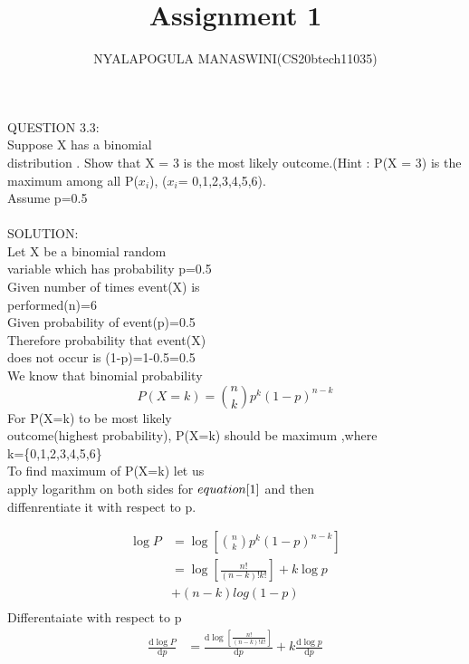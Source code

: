 \documentclass{assignment}
\begin{document}
\title{Assignment 1}
\author{NYALAPOGULA MANASWINI(CS20btech11035)}
\maketitle
\begin{paracol}{2}
\switchcolumn[0]
\begin{Large}
QUESTION 3.3:\\
Suppose X has a binomial\\
 distribution . Show that X = 3 is the most likely outcome.(Hint : P(X = 3) is the maximum among all P($x_i$), ($x_i$= 0,1,2,3,4,5,6).\\Assume p=0.5\\ 
 \\
SOLUTION:\\
Let X be a binomial random \\variable which has probability p=0.5\\
Given number of times event(X) is\\
 performed(n)=6\\
Given probability of event(p)=0.5\\
Therefore probability that event(X)\\ does not occur is
(1-p)=1-0.5=0.5\\
We know that binomial probability\\
\begin{equation}
P(X=k)= \binom{n}{k}p^k({1-p})^{n-k}  \label{1} 
\end{equation}
For P(X=k) to be most likely\\
outcome(highest probability),
P(X=k) should be maximum ,where\\
 k=\{0,1,2,3,4,5,6\}\\
To find maximum of P(X=k) let us\\
\switchcolumn[1]
 apply logarithm on both sides for $equation\eqref{1}$ and then \\diffenrentiate it with respect
to p.
\end{Large}
\begin{large}
\begin{align*}
\log P&=\log[\binom{n}{k}p^k({1-p})^{n-k}]  \\
&=\log[\frac{n!}{(n-k)!k!}]+k \log p\\
 &+(n-k)log (1-p) \\
\end{align*}
Differentaiate with respect to p
\begin{align*}
\frac{\mathrm{d} \log P}{\mathrm{d} p}&=\frac{\mathrm{d} \log[\frac{n!}{(n-k)!k!}]}{\mathrm{d}p}+k \frac{\mathrm{d}\log p}{\mathrm{d} p}\\

\end{align*}
\end{large}
\end{paracol}
\end{document}
